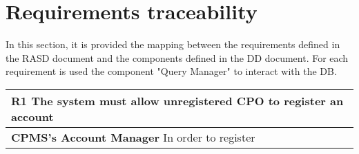 \section{Requirements traceability}
In this section, it is provided the mapping between the requirements defined in the RASD document and the components defined in the DD document. 
For each requirement is used the component "Query Manager" to interact with the DB.

\begin{table}[H]
    \begin{tabularx}{\textwidth}{X}
        \toprule
        \textbf{R1} The system must allow unregistered CPO to register an account                                                       \\ \midrule
        \textbf{CPMS's Account Manager}  In order to register       \\
    \end{tabularx}
\end{table}

